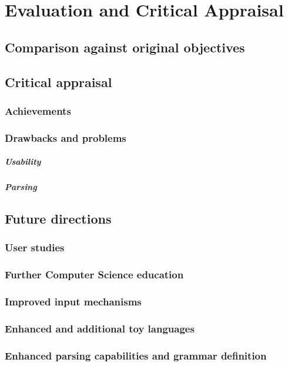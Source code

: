 \chapter{Evaluation and Critical Appraisal}

\section{Comparison against original objectives}

\section{Critical appraisal}

\subsection{Achievements}

\subsection{Drawbacks and problems}

\paragraph{Usability}

\paragraph{Parsing}

\section{Future directions}

\subsection{User studies}

\subsection{Further Computer Science education}

\subsection{Improved input mechanisms}

\subsection{Enhanced and additional toy languages}

\subsection{Enhanced parsing capabilities and grammar definition}
